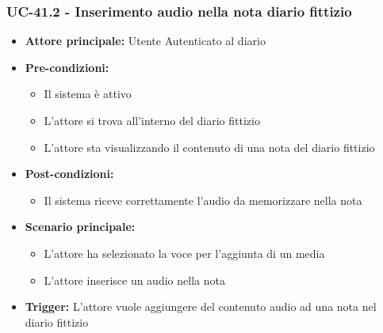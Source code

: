 \documentclass[a4paper,12pt]{article}
\begin{document}
\subsubsection{UC-41.2 - Inserimento audio nella nota diario fittizio} \label{subsec:UC-41.2}
\begin{itemize}
    \item \textbf{Attore principale:} Utente Autenticato al diario
    \item \textbf{Pre-condizioni:}
    \begin{itemize}
        \item Il sistema è attivo
        \item L'attore si trova all'interno del diario fittizio
        \item L'attore sta visualizzando il contenuto di una nota del diario fittizio
    \end{itemize}
    \item \textbf{Post-condizioni:}
    \begin{itemize}
        \item Il sistema riceve correttamente l'audio da memorizzare nella nota
    \end{itemize}
    \item \textbf{Scenario principale:}
    \begin{itemize}
        \item L'attore ha selezionato la voce per l'aggiunta di un media
        \item L'attore inserisce un audio nella nota
    \end{itemize}
    \item \textbf{Trigger:} L'attore vuole aggiungere del contenuto audio ad una nota nel diario fittizio
\end{itemize}
\end{document}
